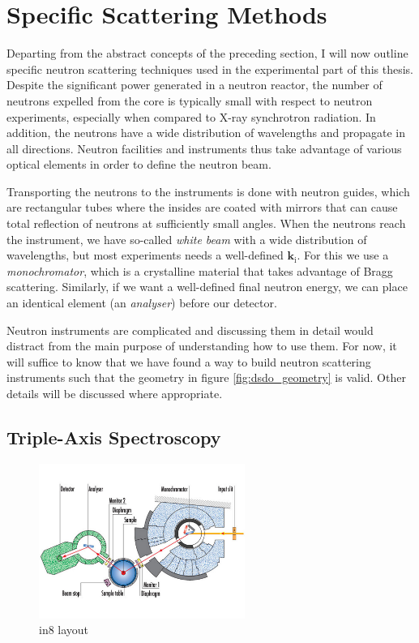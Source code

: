 \section{Specific Scattering Methods}
Departing from the abstract concepts of the preceding section, I will now outline specific neutron scattering techniques used in the experimental part of this thesis. Despite the significant power generated in a neutron reactor, the number of neutrons expelled from the core is typically small with respect to neutron experiments, especially when compared to X-ray synchrotron radiation. In addition, the neutrons have a wide distribution of wavelengths and propagate in all directions. Neutron facilities and instruments thus take advantage of various optical elements in order to define the neutron beam.

Transporting the neutrons to the instruments is done with neutron guides, which are rectangular tubes where the insides are coated with mirrors that can cause total reflection of neutrons at sufficiently small angles. When the neutrons reach the instrument, we have so-called \emph{white beam} with a wide distribution of wavelengths, but most experiments needs a well-defined $\bm{k}_\text{i}$. For this we use a \emph{monochromator}, which is a crystalline material that takes advantage of Bragg scattering. Similarly, if we want a well-defined final neutron energy, we can place an identical element (an \emph{analyser}) before our detector.

Neutron instruments are complicated and discussing them in detail would distract from the main purpose of understanding how to use them. For now, it will suffice to know that we have found a way to build neutron scattering instruments such that the geometry in figure \ref{fig:dsdo_geometry} is valid. Other details will be discussed where appropriate.

\subsection{Triple-Axis Spectroscopy}

\begin{figure}
	\centering
	\includegraphics[width=0.6\textwidth]{fig/method/ns/in8.jpg}
	\caption[in8 layout]{in8 layout \cite{in8}}
	\label{fig:in8}
\end{figure}

